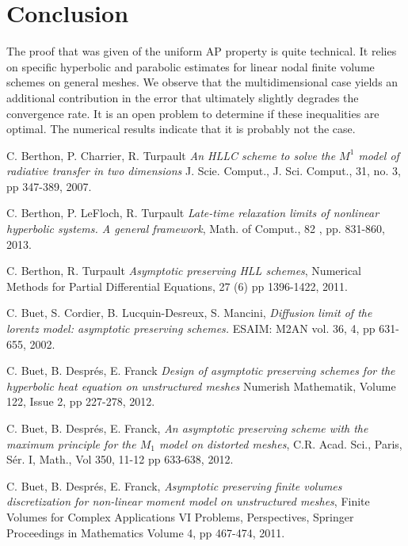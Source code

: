 \documentclass[a4paper,french,english,10pt]{article}
\begin{document}
\section{Conclusion}


The proof that was given of the uniform AP property is quite technical.
It relies on specific hyperbolic and parabolic estimates for linear
nodal finite volume schemes on general meshes.
We observe that the multidimensional case yields an additional contribution in the error
that ultimately slightly degrades the convergence rate.
It is an open problem to determine if these inequalities are optimal.
The numerical results indicate that it is probably not the case.




{\footnotesize 
\begin{thebibliography}{abcde}   



 C. Berthon, P. Charrier, R. Turpault \emph{An HLLC scheme
to solve the $M^1$ model of radiative transfer in two dimensions} J. Scie.
Comput., J. Sci. Comput., 31, no. 3, pp 347-389, 2007.

 C. Berthon, P. LeFloch, R. Turpault  \emph{Late-time relaxation limits of nonlinear hyperbolic systems. A general framework}, Math. of Comput., 82 , pp. 831-860, 2013. 

 C. Berthon, R. Turpault \emph{Asymptotic preserving HLL
schemes}, Numerical Methods for Partial Differential Equations, 27 (6)  pp
1396-1422, 2011.

 C. Buet, S. Cordier,   B. Lucquin-Desreux, S. Mancini, 
\emph{Diffusion limit of the lorentz model: asymptotic preserving schemes.}
ESAIM: M2AN vol. 36, 4, pp 631-655, 2002.

 C. Buet, B. Despr\'es, E. Franck \emph{Design of
asymptotic preserving schemes for the hyperbolic heat equation on unstructured
meshes} Numerish Mathematik, Volume 122, Issue 2, pp 227-278,  2012.

 C. Buet, B. Despr\'es, E. Franck, \emph{An asymptotic
preserving scheme with the maximum principle for the $M_1$ model on distorted
meshes}, C.R. Acad. Sci., Paris, S\'er. I, Math., Vol 350,  11-12
pp 633-638,  2012.

 C. Buet, B. Despr\'es, E. Franck, \emph{Asymptotic
preserving finite volumes discretization for non-linear moment model on
unstructured meshes}, Finite Volumes for Complex Applications VI Problems,
Perspectives, Springer Proceedings in Mathematics Volume 4, pp 467-474, 2011.




\end{thebibliography}}
\end{document}
